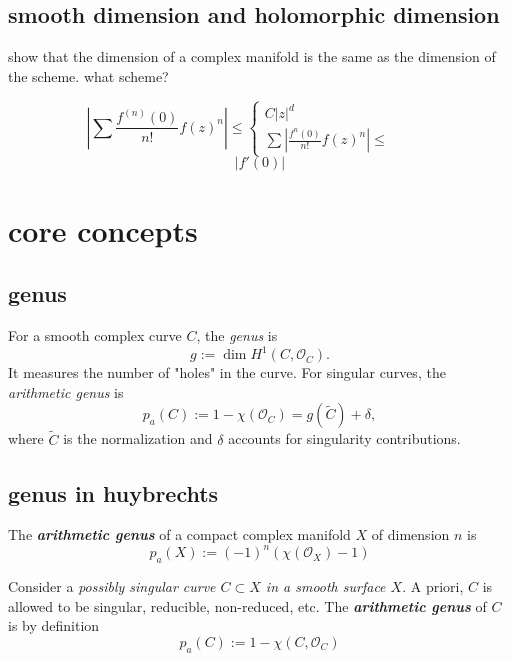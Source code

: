 \subsection{smooth dimension and holomorphic dimension}

\begin{exercise}\leavevmode
show that the dimension of a complex manifold is the same as the dimension of the scheme. what scheme?
\end{exercise}

\[\left| \sum \frac{f^{(n)}(0)}{n!}f(z)^n \right|\leq \begin{cases}
	C|z|^d\qquad & \\
	\sum \left| \frac{f^{n}(0)}{n!}f(z)^n \right|\leq  \qquad &
\end{cases} \]
 \[|f'(0)|\]
 

\section{core concepts}

\subsection{genus}
For a smooth complex curve \( C \), the \emph{genus} is
\[
g := \dim H^1(C, \mathcal{O}_C).
\]
It measures the number of "holes" in the curve. For singular curves, the \emph{arithmetic genus} is
\[
p_a(C) := 1 - \chi(\mathcal{O}_C) = g(\widetilde{C}) + \delta,
\]
where \( \widetilde{C} \) is the normalization and \( \delta \) accounts for singularity contributions.

\subsection*{genus in huybrechts}
\begin{defn}\leavevmode
The \textit{\textbf{arithmetic genus}} of a compact complex manifold \(X\) of dimension \(n\) is
\[\boxed{p_a(X):=(-1)^n (\chi(\mathcal{O}_X)-1)}\]
\end{defn}

\begin{defn}\leavevmode
	Consider a \textit{possibly singular curve \(C \subset X\) in a smooth surface \(X\)}. A priori, \(C\) is allowed to be singular, reducible, non-reduced, etc. The \textit{\textbf{arithmetic genus}} of \(C\) is by definition
	\[\boxed{p_a(C):= 1 - \chi(C, \mathcal{O}_C)}\]
\end{defn}

